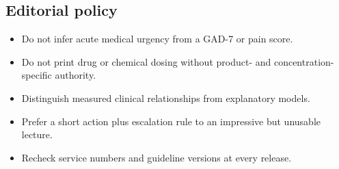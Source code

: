 \hypertarget{editorial-policy}{%
\subsection{Editorial policy}\label{editorial-policy}}

\begin{itemize}
\tightlist
\item
  Do not infer acute medical urgency from a GAD-7 or pain score.
\item
  Do not print drug or chemical dosing without product- and
  concentration-specific authority.
\item
  Distinguish measured clinical relationships from explanatory models.
\item
  Prefer a short action plus escalation rule to an impressive but
  unusable lecture.
\item
  Recheck service numbers and guideline versions at every release.
\end{itemize}
